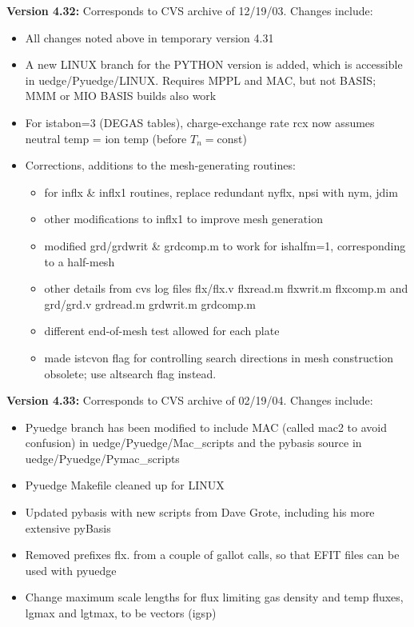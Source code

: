 \documentclass [12pt]{article}
\begin{document}
\noindent\textbf{Version 4.32:} Corresponds to CVS archive of 12/19/03.  
Changes include:
\begin{itemize}
  \item All changes noted above in temporary version 4.31
  \item A new LINUX branch for the PYTHON version is added, which
          is accessible in uedge/Pyuedge/LINUX.  Requires MPPL and
          MAC, but not BASIS; MMM or MIO BASIS builds also work
  \item For istabon=3 (DEGAS tables), charge-exchange rate {\sf rcx}
          now assumes neutral temp = ion temp (before $T_n=$const)
  \item Corrections, additions to the mesh-generating routines:
  \begin{itemize}
          \item for inflx \& inflx1 routines, replace redundant 
            {\sf nyflx, npsi} with {\sf nym, jdim}
          \item other modifications to inflx1 to improve mesh generation
          \item modified grd/grdwrit \& grdcomp.m to work for {\sf ishalfm=1}, 
            corresponding to a half-mesh
          \item other details from cvs log files flx/flx.v flxread.m 
            flxwrit.m flxcomp.m and grd/grd.v grdread.m grdwrit.m
            grdcomp.m
          \item different end-of-mesh test allowed for each plate
          \item  made {\sf istcvon} flag for controlling search directions in
            mesh construction obsolete; use {\sf altsearch} flag instead.
  \end{itemize}
\end{itemize}

\noindent\textbf{Version 4.33:} Corresponds to CVS archive of 02/19/04.  
Changes include:
\begin{itemize}
  \item Pyuedge branch has been modified to include MAC (called mac2
          to avoid confusion) in uedge/Pyuedge/Mac\_scripts and
          the pybasis source in uedge/Pyuedge/Pymac\_scripts
  \item Pyuedge Makefile cleaned up for LINUX
  \item Updated pybasis with new scripts from Dave Grote, including
          his more extensive pyBasis
  \item Removed prefixes flx. from a couple of gallot calls, so
          that EFIT files can be used with pyuedge
  \item Change maximum scale lengths for flux limiting gas density
          and temp fluxes, lgmax and lgtmax, to be vectors (igsp)
\end{itemize}
\end{document}
